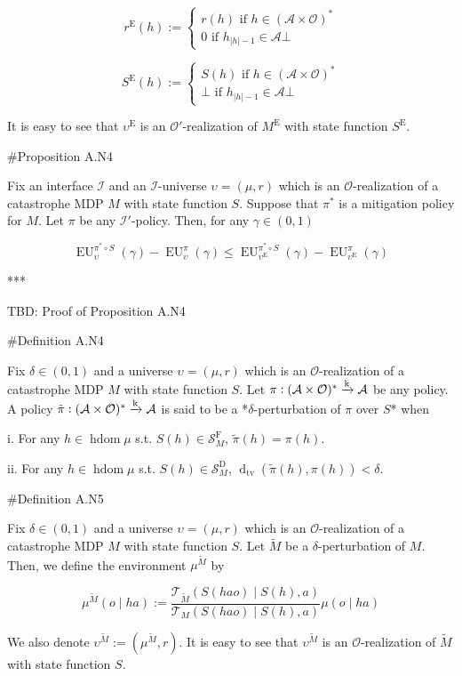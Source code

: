 \documentclass[a4paper]{article}
\newcommand{\AP}[1]{\left(#1\right)}
\newcommand{\Dtva}[1]{\operatorname{d}_{\text{tv}}\AP{#1}}
\newcommand{\Abs}[1]{\lvert #1 \rvert}
\newcommand{\M}{\xrightarrow{\textnormal{k}}}
\newcommand{\Ob}{\mathcal{O}}
\newcommand{\A}{\mathcal{A}}
\newcommand{\St}{\mathcal{S}}
\newcommand{\T}{\mathcal{T}}
\newcommand{\In}{\mathcal{I}}
\newcommand{\FH}{(\A \times \Ob)^*}
\DeclareMathOperator{\HD}{hdom}
\newcommand{\RMD}{\mathrm{D}}
\newcommand{\RME}{\mathrm{E}}
\newcommand{\RMF}{\mathrm{F}}
\newcommand{\SF}{\St^{\RMF}}
\newcommand{\SD}{\St^{\RMD}}
\newcommand{\ME}{M^{\RME}}
\newcommand{\EU}{\operatorname{EU}}
\begin{document}
$$r^\RME(h):=\begin{cases} r(h) \text{ if } h\in\FH \\ 0 \text{ if } h_{\Abs{h}-1} \in \A \bot\end{cases}$$

$$S^\RME(h):=\begin{cases} S(h) \text{ if } h\in\FH \\ \bot \text{ if } h_{\Abs{h}-1} \in \A\bot\end{cases}$$

It is easy to see that $\upsilon^\RME$ is an $\Ob'$-realization of $\ME$ with state function $S^\RME$.

\#Proposition A.N4

Fix an interface $\In$ and an $\In$-universe $\upsilon=(\mu,r)$ which is an $\Ob$-realization of a catastrophe MDP $M$ with state function $S$. Suppose that $\pi^*$ is a mitigation policy for $M$. Let $\pi$ be any $\In'$-policy. Then, for any $\gamma\in(0,1)$

$$\EU_{\upsilon}^{\pi^* \circ S}(\gamma)-\EU_{\upsilon}^{\pi}(\gamma) \leq \EU_{\upsilon^\RME}^{\pi^* \circ S}(\gamma)-\EU_{\upsilon^\RME}^{\pi}(\gamma)$$

***

TBD: Proof of Proposition A.N4

\#Definition A.N4

Fix $\delta\in(0,1)$ and a universe $\upsilon=(\mu,r)$ which is an $\Ob$-realization of a catastrophe MDP $M$ with state function $S$. Let $\pi: \FH \M \A$ be any policy. A policy $\tilde{\pi}: \FH \M \A$ is said to be a *$\delta$-perturbation of $\pi$ over $S$* when

i. For any $h \in \HD{\mu}$ s.t. $S(h)\in\SF_M$, $\tilde{\pi}(h)=\pi(h)$.

ii. For any $h \in \HD{\mu}$ s.t. $S(h)\in\SD_M$, $\Dtva{\tilde{\pi}(h),\pi(h)} < \delta$.


\#Definition A.N5

Fix $\delta\in(0,1)$ and a universe $\upsilon=(\mu,r)$ which is an $\Ob$-realization of a catastrophe MDP $M$ with state function $S$. Let $\tilde{M}$ be a $\delta$-perturbation of $M$. Then, we define the environment $\mu^{\tilde{M}}$ by

$$\mu^{\tilde{M}}(o \mid ha) := \frac{\T_{\tilde{M}}\AP{S(hao) \mid S(h),a}}{\T_{M}\AP{S(hao) \mid S(h),a}}\mu(o \mid ha)$$

We also denote $\upsilon^{\tilde{M}}:=\AP{\mu^{\tilde{M}},r}$. It is easy to see that $\upsilon^{\tilde{M}}$ is an $\Ob$-realization of $\tilde{M}$ with state function $S$.
\end{document}
